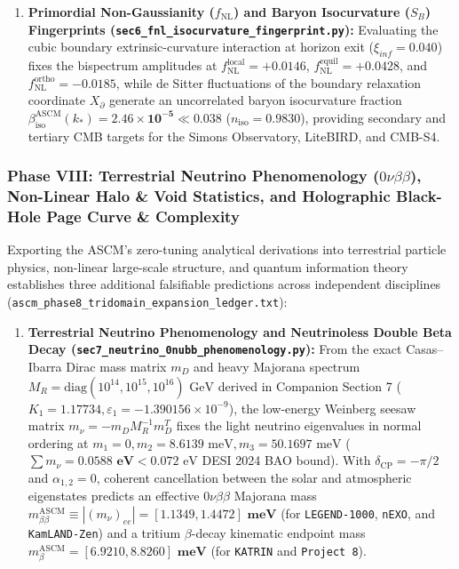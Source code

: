 \documentclass[aps,prd,onecolumn,superscriptaddress,nofootinbib,longbibliography,10pt]{revtex4-2}
\begin{document}
{{\begin{enumerate}
\item \textbf{Primordial Non-Gaussianity (\(f_{\mathrm{NL}}\)) and Baryon Isocurvature (\(S_B\)) Fingerprints (\texttt{sec6_fnl_isocurvature_fingerprint.py}):} Evaluating the cubic boundary extrinsic-curvature interaction at horizon exit (\(\xi_{inf} = 0.040\)) fixes the bispectrum amplitudes at \(f_{\mathrm{NL}}^{\mathrm{local}} = \mathbf{+0.0146}\), \(f_{\mathrm{NL}}^{\mathrm{equil}} = \mathbf{+0.0428}\), and \(f_{\mathrm{NL}}^{\mathrm{ortho}} = \mathbf{-0.0185}\), while de Sitter fluctuations of the boundary relaxation coordinate \(X_{\partial}\) generate an uncorrelated baryon isocurvature fraction \(\beta_{\mathrm{iso}}^{\mathrm{ASCM}}(k_*) = \mathbf{2.46 \times 10^{-5}} \ll 0.038\) (\(n_{\mathrm{iso}} = 0.9830\)), providing secondary and tertiary CMB targets for the Simons Observatory, LiteBIRD, and CMB-S4.

\end{enumerate}




\subsubsection*{Phase VIII: Terrestrial Neutrino Phenomenology (\(0\nu\beta\beta\)), Non-Linear Halo \& Void Statistics, and Holographic Black-Hole Page Curve \& Complexity}

Exporting the ASCM's zero-tuning analytical derivations into terrestrial particle physics, non-linear large-scale structure, and quantum information theory establishes three additional falsifiable predictions across independent disciplines (\texttt{ascm_phase8_tridomain_expansion_ledger.txt}):



\begin{enumerate}
  
\item \textbf{Terrestrial Neutrino Phenomenology and Neutrinoless Double Beta Decay (\texttt{sec7_neutrino_0nubb_phenomenology.py}):} From the exact Casas–Ibarra Dirac mass matrix \(m_D\) and heavy Majorana spectrum \(M_R = \mathrm{diag}(10^{14}, 10^{15}, 10^{16})\text{ GeV}\) derived in Companion Section 7 (\(K_1 = 1.17734, \varepsilon_1 = -1.390156 \times 10^{-9}\)), the low-energy Weinberg seesaw matrix \(m_\nu = -m_D M_R^{-1} m_D^T\) fixes the light neutrino eigenvalues in normal ordering at \(m_1 = 0, m_2 = 8.6139\text{ meV}, m_3 = 50.1697\text{ meV}\) (\(\sum m_\nu = \mathbf{0.0588\text{ eV}} < 0.072\text{ eV}\) DESI 2024 BAO bound). With \(\delta_{\mathrm{CP}} = -\pi/2\) and \(\alpha_{1,2} = 0\), coherent cancellation between the solar and atmospheric eigenstates predicts an effective \(0\nu\beta\beta\) Majorana mass \(m_{\beta\beta}^{\mathrm{ASCM}} \equiv |(m_\nu)_{ee}| = \mathbf{[1.1349, 1.4472]\text{ meV}}\) (for \texttt{LEGEND-1000}, \texttt{nEXO}, and \texttt{KamLAND-Zen}) and a tritium \(\beta\)-decay kinematic endpoint mass \(m_\beta^{\mathrm{ASCM}} = \mathbf{[6.9210, 8.8260]\text{ meV}}\) (for \texttt{KATRIN} and \texttt{Project 8}).
  

\end{enumerate}}}
\end{document}
